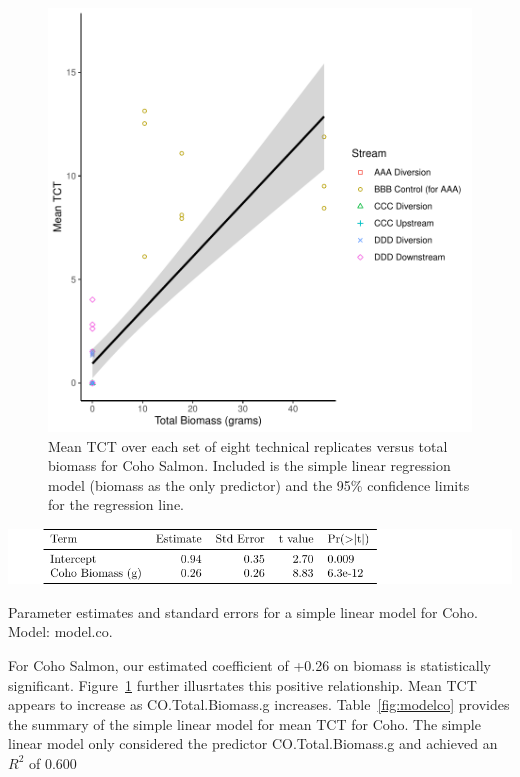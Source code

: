 \begin{figure}[H]
\includegraphics{Chapter5Images/model_CO.pdf}
\caption{  \hspace{1mm}Mean TCT over each set of eight technical replicates versus total biomass for Coho Salmon. Included is the simple linear regression model (biomass as the only predictor) and the 95\% confidence limits for the regression line.}
\label{fig:cohoanalysis}
\end{figure}


\begin{table}[H]
\includegraphics{Chapter5Images/coholinearfield.pdf}
\caption{Parameter estimates and standard errors for a simple linear model for Coho. Model: model.co.}
\label{fig:modelco}
\end{table}



For Coho Salmon, our estimated coefficient of +0.26 on biomass is statistically significant.  Figure~\ref{fig:cohoanalysis} further illusrtates this positive relationship. Mean TCT appears to increase as CO.Total.Biomass.g increases. Table~\ref{fig:modelco} provides the summary of the simple linear model for mean TCT for Coho. The simple linear model only considered the predictor CO.Total.Biomass.g and achieved an $R^{2}$ of 0.600



